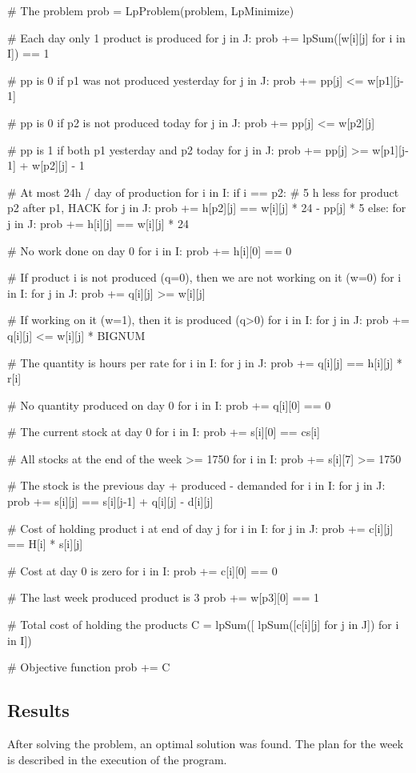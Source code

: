 \documentclass[11pt,a4paper]{article}
\begin{document}
\begin{pycode}
# The problem
prob = LpProblem(problem, LpMinimize)

# Each day only 1 product is produced
for j in J:
	prob += lpSum([w[i][j] for i in I]) == 1

# pp is 0 if p1 was not produced yesterday
for j in J:
	prob += pp[j] <= w[p1][j-1]

# pp is 0 if p2 is not produced today
for j in J:
	prob += pp[j] <= w[p2][j]

# pp is 1 if both p1 yesterday and p2 today
for j in J:
	prob += pp[j] >= w[p1][j-1] + w[p2][j] - 1


# At most 24h / day of production
for i in I:
	if i == p2:
		# 5 h less for product p2 after p1, HACK
		for j in J:
			prob += h[p2][j] == w[i][j] * 24 - pp[j] * 5
	else:
		for j in J:
			prob += h[i][j] == w[i][j] * 24

# No work done on day 0
for i in I:
	prob += h[i][0] == 0

# If product i is not produced (q=0), then we are not working on it (w=0)
for i in I:
	for j in J:
		prob += q[i][j] >= w[i][j]

# If working on it (w=1), then it is produced (q>0)
for i in I:
	for j in J:
		prob += q[i][j] <= w[i][j] * BIGNUM

# The quantity is hours per rate
for i in I:
	for j in J:
		prob += q[i][j] == h[i][j] * r[i]

# No quantity produced on day 0
for i in I:
	prob += q[i][0] == 0

# The current stock at day 0
for i in I:
	prob += s[i][0] == cs[i]

# All stocks at the end of the week >= 1750
for i in I:
	prob += s[i][7] >= 1750

# The stock is the previous day + produced - demanded
for i in I:
	for j in J:
		prob += s[i][j] == s[i][j-1] + q[i][j] - d[i][j]

# Cost of holding product i at end of day j
for i in I:
	for j in J:
		prob += c[i][j] == H[i] * s[i][j]

# Cost at day 0 is zero
for i in I:
	prob += c[i][0] == 0

# The last week produced product is 3
prob += w[p3][0] == 1

# Total cost of holding the products
C = lpSum([ lpSum([c[i][j] for j in J])  for i in I])

# Objective function
prob += C
\end{pycode}
%
\subsection*{Results}
%
After solving the problem, an optimal solution was found. The plan for the week 
is described in the execution of the program.
\end{document}
